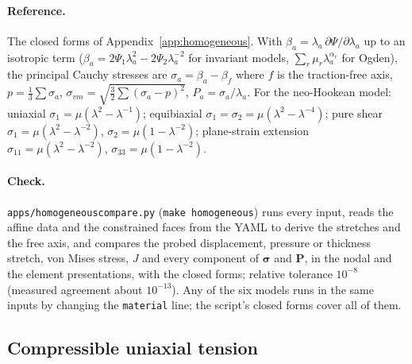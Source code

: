 \documentclass[11pt]{article}
\newcommand{\bsig}{\bm{\sigma}}
\newcommand{\bP}{\bm{P}}
\DeclareRobustCommand{\code}[1]{{\def\_{\textunderscore\allowbreak}\texttt{#1}}}
\DeclareRobustCommand{\file}[1]{{\def\_{\textunderscore\allowbreak}\texttt{#1}}}
\begin{document}
\paragraph{Reference.}
The closed forms of Appendix~\ref{app:homogeneous}.  With $\beta_a = \lambda_a\,\partial\Psi/\partial\lambda_a$
up to an isotropic term ($\beta_a = 2\Psi_1\lambda_a^2 - 2\Psi_2\lambda_a^{-2}$
for invariant models, $\sum_r\mu_r\lambda_a^{\alpha_r}$ for Ogden), the
principal Cauchy stresses are $\sigma_a = \beta_a - \beta_f$ where $f$ is
the traction-free axis, $p = \tfrac13\sum\sigma_a$,
$\sigma_{vm} = \sqrt{\tfrac32\sum(\sigma_a - p)^2}$, $P_a = \sigma_a/\lambda_a$.
For the neo-Hookean model: uniaxial $\sigma_1 = \mu(\lambda^2 - \lambda^{-1})$;
equibiaxial $\sigma_1 = \sigma_2 = \mu(\lambda^2 - \lambda^{-4})$; pure shear
$\sigma_1 = \mu(\lambda^2 - \lambda^{-2})$, $\sigma_2 = \mu(1 - \lambda^{-2})$;
plane-strain extension $\sigma_{11} = \mu(\lambda^2 - \lambda^{-2})$,
$\sigma_{33} = \mu(1 - \lambda^{-2})$.

\paragraph{Check.}
\file{apps/homogeneous\_compare.py} (\code{make homogeneous}) runs every
input, reads the affine data and the constrained faces from the YAML to
derive the stretches and the free axis, and compares the probed
displacement, pressure or thickness stretch, von Mises stress, $J$ and
every component of $\bsig$ and $\bP$, in the nodal and the element
presentations, with the closed forms; relative tolerance $10^{-8}$
(measured agreement about $10^{-13}$).  Any of the six models runs in the
same inputs by changing the \code{material} line; the script's closed
forms cover all of them.

\subsection{Compressible uniaxial tension}
\label{sec:compuniaxial}
\end{document}
